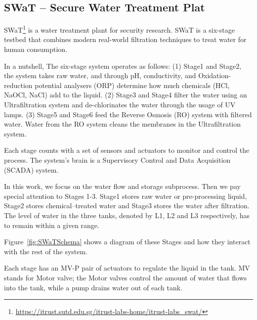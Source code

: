 {\subsection{SWaT -- Secure Water Treatment Plat}

SWaT\footnote{\url{https://itrust.sutd.edu.sg/itrust-labs-home/itrust-labs_swat/}} is a water treatment plant for security research. SWaT is a six-stage testbed that combines modern real-world filtration techniques to treat water for human consumption. 

In a nutshell, The six-stage system operates as follows:
(1) Stage1 and Stage2, the system takes raw water, and through pH, conductivity, and Oxidation-reduction potential analysers (ORP) determine how much chemicals (HCl, NaOCl, NaCl) add to the liquid. 
(2) Stage3 and Stage4 filter the water using an Ultrafiltration system and de-chlorinates the water through the usage of UV lamps. 
(3) Stage5 and Stage6 feed the Reverse Osmosis (RO) system with filtered water. Water from the RO system cleans the membranes in the Ultrafiltration system. 

Each stage counts with a set of sensors and actuators to monitor and control the process. The system's brain is a Supervisory Control and Data Acquisition (SCADA) system.

In this work, we focus on the water flow and storage subprocess. Then we pay special attention to Stages 1-3. Stage1 stores raw water or pre-processing liquid, Stage2 stores chemical--treated water and Stage3 stores the water after filtration.
The level of water in the three tanks, denoted by L1, L2 and L3 respectively, has to remain within a given range.

Figure~\ref{fig:SWaTSchema} shows a diagram of these Stages and how they interact with the rest of the system. 

Each stage has an MV-P pair of actuators to regulate the liquid in the tank. MV stands for Motor valve; the Motor valves control the amount of water that flows into the tank, while a pump drains water out of each tank.
 

}
